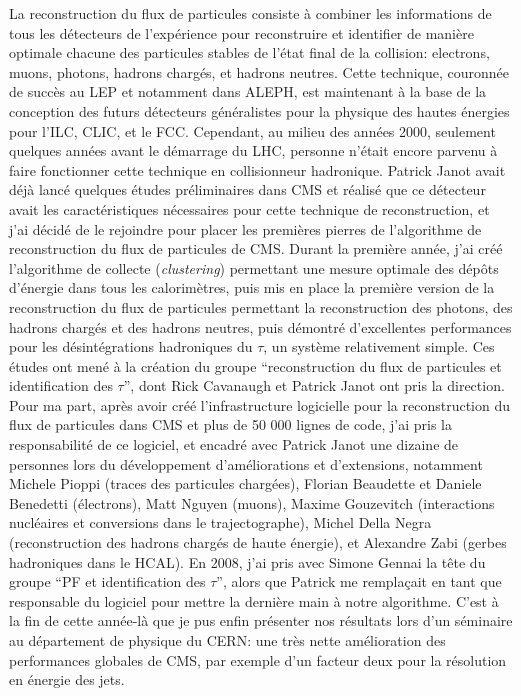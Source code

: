 \documentclass[11pt,twoside,a4paper,tdr]{cms-tdr}
\begin{document}
La reconstruction du flux de particules consiste à combiner les informations de tous les détecteurs de l'expérience pour reconstruire et identifier de manière optimale chacune des particules stables de l'état final de la collision: electrons, muons, photons, hadrons chargés, et hadrons neutres. 
Cette technique, couronnée de succès au LEP et notamment dans ALEPH, 
est maintenant à la base de la conception des futurs détecteurs généralistes pour la physique des hautes énergies 
pour l'ILC, CLIC, et le FCC. 
Cependant, au milieu des années 2000, seulement quelques années avant le démarrage du LHC, 
personne n'était encore parvenu à faire fonctionner cette technique en collisionneur hadronique.
Patrick Janot avait déjà lancé quelques études préliminaires dans CMS et réalisé que ce détecteur avait les caractéristiques nécessaires pour cette technique de reconstruction, 
et j'ai décidé de le rejoindre pour placer les premières pierres de l'algorithme de reconstruction du flux de particules de CMS.
Durant la première année, j'ai créé l'algorithme de collecte ({\em clustering}) permettant une mesure optimale des dépôts d'énergie dans tous les calorimètres, puis mis en place la première version de la reconstruction du flux de particules permettant la reconstruction des photons, des hadrons chargés et des hadrons neutres, puis démontré d'excellentes performances pour les désintégrations hadroniques du $\tau$, un système relativement simple.
Ces études ont mené à la création du groupe ``reconstruction du flux de particules et identification des $\tau$'', dont Rick Cavanaugh et Patrick Janot ont pris la direction. 
Pour ma part, après avoir créé l'infrastructure logicielle pour la reconstruction du flux de particules dans CMS et plus de 50 000 lignes de code, j'ai pris la responsabilité de ce logiciel, et encadré avec Patrick Janot une dizaine de personnes lors du développement d'améliorations et d'extensions, notamment Michele Pioppi (traces des particules chargées), Florian Beaudette et Daniele Benedetti (électrons), Matt Nguyen (muons), Maxime Gouzevitch (interactions nucléaires et conversions dans le trajectographe), Michel Della Negra (reconstruction des hadrons chargés de haute énergie), et Alexandre Zabi (gerbes hadroniques dans le HCAL).
En 2008, j'ai pris avec Simone Gennai la tête du groupe ``PF et identification des $\tau$'', alors que Patrick me remplaçait en tant que responsable du logiciel pour mettre la dernière main à notre algorithme. 
C'est à la fin de cette année-là que je pus enfin présenter nos résultats lors d'un séminaire au département de physique du CERN: une très nette amélioration des performances globales de CMS, par exemple d'un facteur deux pour la résolution en énergie des jets. 
\end{document}
